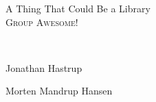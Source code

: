 \documentclass[pdftex,12pt,a4paper]{report}
\begin{document}
\begin{titlepage}
\begin{center}



{ \huge{A Thing That Could Be a Library} }
\\[1.5cm]

\textsc{Group Awesome!}

\begin{figure}[!h]
	\centering
\end{figure}


\textsc{\Large }\\[0.5cm]

\begin{minipage}{0.46\textwidth}
\begin{flushleft} \large
Jonathan Hastrup\\
\end{flushleft}
\end{minipage}
\begin{minipage}{0.45\textwidth}
\begin{flushright} \large
Morten Mandrup Hansen\\
\end{flushright}
\end{minipage}

\vfill

\end{center}
\end{titlepage}
\end{document}
